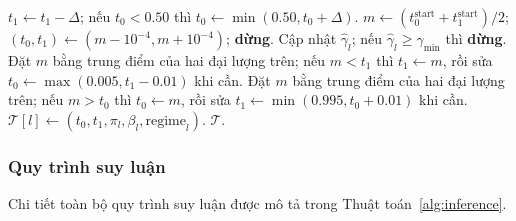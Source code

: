 \documentclass[11pt,a4paper]{article}
\newcounter{alg}
\begin{document}
\begin{algorithm}[H]
\begin{algorithmic}[1]
      \ELSE
        \STATE \(t_1\gets t_1-\Delta\); nếu \(t_0<0.50\) thì \(t_0\gets\min(0.50,t_0+\Delta)\).
      \ENDIF
        \STATE \(m\gets(t_0^{\mathrm{start}}+t_1^{\mathrm{start}})/2\); \((t_0,t_1)\gets(m-10^{-4},m+10^{-4})\); \textbf{dừng}.
      \ENDIF
      \STATE Cập nhật \(\widehat\gamma_l\); nếu \(\widehat\gamma_l\ge\gamma_{\min}\) thì \textbf{dừng}.
    \ENDFOR
  \ENDIF
    \STATE Đặt \(m\) bằng trung điểm của hai đại lượng trên; nếu \(m<t_1\) thì \(t_1\gets m\), rồi sửa \(t_0\gets\max(0.005,t_1-0.01)\) khi cần.
    \STATE Đặt \(m\) bằng trung điểm của hai đại lượng trên; nếu \(m>t_0\) thì \(t_0\gets m\), rồi sửa \(t_1\gets\min(0.995,t_0+0.01)\) khi cần.
  \ENDIF
  \STATE \(\mathcal T[l]\gets(t_0,t_1,\pi_l,\beta_l,\mathrm{regime}_l)\).
\ENDFOR
\RETURN \(\mathcal T\).
\end{algorithmic}
\end{algorithm}

\subsubsection{Quy trình suy luận}
Chi tiết toàn bộ quy trình suy luận được mô tả trong Thuật toán~\ref{alg:inference}.
\end{document}

